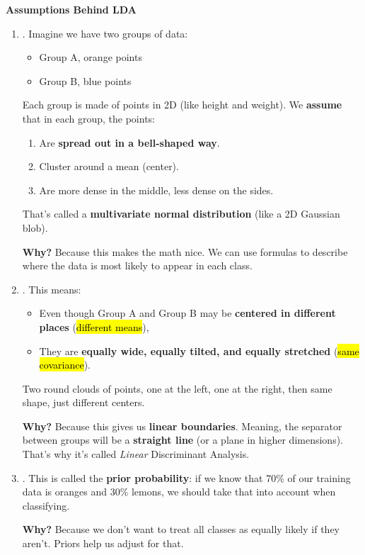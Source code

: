 \highspace
\begin{flushleft}
    \textcolor{Green3}{ \textbf{Assumptions Behind LDA}}
\end{flushleft}
\begin{enumerate}
    \item {}. Imagine we have two groups of data:
    \begin{itemize}
        \item Group A, orange points
        \item Group B, blue points
    \end{itemize}
    Each group is made of points in 2D (like height and weight). We \textbf{assume} that in each group, the points:
    \begin{enumerate}
        \item Are \textbf{spread out in a bell-shaped way}.
        \item Cluster around a mean (center).
        \item Are more dense in the middle, less dense on the sides.
    \end{enumerate}
    That's called a \textbf{multivariate normal distribution} (like a 2D Gaussian blob).

    \textcolor{Green3}{ \textbf{Why?}} Because this makes the math nice. We can use formulas to describe where the data is most likely to appear in each class.


    \item {}. This means:
    \begin{itemize}
        \item Even though Group A and Group B may be \textbf{centered in different places} (\hl{different means}),
        \item They are \textbf{equally wide, equally tilted, and equally stretched} (\hl{same covariance}).
    \end{itemize}
    Two round clouds of points, one at the left, one at the right, then same shape, just different centers.

    \textcolor{Green3}{ \textbf{Why?}} Because this gives us \textbf{linear boundaries}. Meaning, the separator between groups will be a \textbf{straight line} (or a plane in higher dimensions). That's why it's called \emph{Linear} Discriminant Analysis.


    \item {}. This is called the \textbf{prior probability}: if we know that 70\% of our training data is oranges and 30\% lemons, we should take that into account when classifying.
    
    \textcolor{Green3}{ \textbf{Why?}} Because we don't want to treat all classes as equally likely if they aren't. Priors help us adjust for that.
\end{enumerate}

